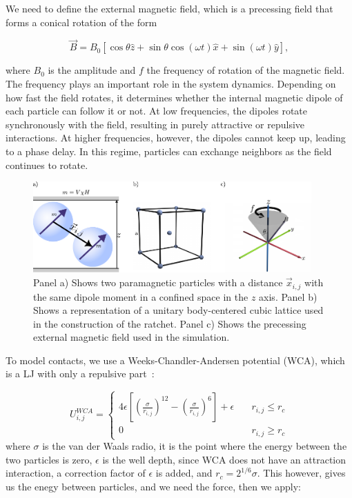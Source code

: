 We need to define the external magnetic field, which is a precessing field that forms a conical rotation of the form

\begin{equation}
  \vec{B} = B_0 [\cos{\theta}\hat{z} + \sin{\theta}\cos{(\omega t)}\hat{x} + \sin{(\omega t)}\hat{y}],
  \label{eq:magneticfield}
\end{equation}


where $B_0$ is the amplitude and $f$ the frequency of rotation of the magnetic field. The frequency plays an important role in the system dynamics. Depending on how fast the field rotates, it determines whether the internal magnetic dipole of each particle can follow it or not. At low frequencies, the dipoles rotate synchronously with the field, resulting in purely attractive or repulsive interactions. At higher frequencies, however, the dipoles cannot keep up, leading to a phase delay. In this regime, particles can exchange neighbors as the field continues to rotate.


\begin{figure}[H]
  \begin{center}
    \includegraphics[width=0.95\textwidth]{figures/methods1.pdf}
  \end{center}
  \caption[Representation of the paramagnetic colloids, body-centered-cubic lattice used for the ratchet, and the precessing conic magnetic field.]{Panel a) Shows two paramagnetic particles with a distance \(\vec{x}_{i,j}\) with the same dipole moment in a confined space in the \( z\) axis. Panel b) Shows a representation of a  unitary body-centered cubic lattice used in the construction of the ratchet. Panel c) Shows the precessing external magnetic field used in the simulation.}\label{fig:facecenteredlattice}
\end{figure}

To model contacts, we use a Weeks-Chandler-Andersen potential (WCA), which is a LJ with only a repulsive part~\cite{hess1999augmented}:

\begin{equation}
  U_{i,j}^{WCA} = \begin{cases} 
    4\epsilon\left[ \left( \frac{\sigma}{r_{i,j}}\right)^{12} - \left( \frac{\sigma}{r_{i,j}}\right)^6\right] + \epsilon \quad &r_{i,j} \leq r_c \\
    0 \quad & r_{i,j} \geq r_c
  \end{cases}
  \label{eq:wcapotential}
\end{equation}
where $\sigma$ is the van der Waals radio, it is the point where the energy between the two particles is zero, $\epsilon$ is the well depth, since WCA does not have an attraction interaction, a correction factor of $\epsilon$ is added, and $r_c = 2^{1/6}\sigma$. This however, gives us the enegy between particles, and we need the force, then we apply:


